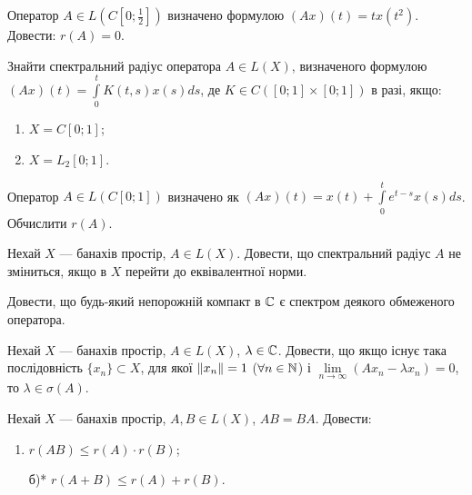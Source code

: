 \begin{exercise}
    Оператор $A \in L(C[0; \frac{1}{2}])$ визначено формулою $(Ax)(t) = t x(t^2)$. Довести: $r(A) = 0$.
\end{exercise}

\begin{exercise}
    Знайти спектральний радіус оператора $A \in L(X)$, визначеного формулою
    $(Ax)(t) = \int\limits_0^t K(t, s) x(s) ds$, де $K \in C([0;1] \times [0;1])$ в разі, якщо:
    \begin{enumerate}
        \item $X = C[0;1]$;
        \item $X = L_2 [0;1]$.
    \end{enumerate}
\end{exercise}

\begin{exercise}
    Оператор $A \in L(C[0;1])$ визначено як $(Ax)(t) = x(t) + \int\limits_0^t e^{t-s} x(s) ds$.
    Обчислити $r(A)$.
\end{exercise}

\begin{exercise}
    Нехай $X$ --- банахів простір, $A \in L(X)$. Довести, що спектральний радіус $A$ не зміниться, якщо
    в $X$ перейти до еквівалентної норми.
\end{exercise}

\begin{exercise}
    Довести, що будь-який непорожній компакт в $\mathbb{C}$ є спектром деякого обмеженого оператора.
\end{exercise}

\begin{exercise}
    Нехай $X$ --- банахів простір, $A \in L(X)$, $\lambda \in \mathbb{C}$. Довести,
    що якщо існує така послідовність $\{ x_n\} \subset X$, для якої $\left\lVert x_n\right\rVert = 1$ ($\forall n \in \mathbb{N}$)
    і $\underset{n \to \infty}{\lim} (A x_n - \lambda x_n) = 0$, то $\lambda \in \sigma (A)$.
\end{exercise}

\begin{exercise}
    Нехай $X$ --- банахів простір, $A, B \in L(X)$, $AB = BA$. Довести:
    \begin{enumerate}
        \item $r(A B) \leq r(A) \cdot r(B)$;
        \item[б)*] $r(A+B) \leq r(A) + r(B)$.
    \end{enumerate}
\end{exercise}

